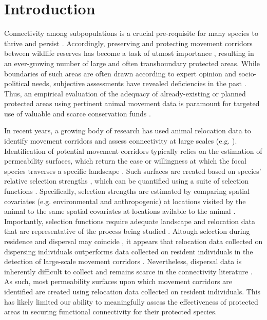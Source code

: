 \documentclass[abstract=on,10pt,a4paper,bibliography=totocnumbered]{article}
\begin{document}
\newpage


\linenumbers

\section{Introduction}
Connectivity among subpopulations is a crucial pre-requisite for many species to
thrive and persist \citep{Fahrig.2003}. Accordingly, preserving and protecting
movement corridors between wildlife reserves has become a task of utmost
importance \citep{Doerr.2011, Rudnick.2012}, resulting in an ever-growing number
of large and often transboundary protected areas. While boundaries of such areas
are often drawn according to expert opinion and socio-political needs,
subjective assessments have revealed deficiencies in the past
\citep{Clevenger.2002, Pullinger.2010}. Thus, an empirical evaluation of the
adequacy of already-existing or planned protected areas using pertinent animal
movement data is paramount for targeted use of valuable and scarce conservation
funds \citep{Pullinger.2010}.

In recent years, a growing body of research has used animal relocation data to
identify movement corridors and assess connectivity at large scales (e.g.
\citealp{Chetkiewicz.2006, Squires.2013, Elliot.2014}). Identification of
potential movement corridors typically relies on the estimation of permeability
surfaces, which return the ease or willingness at which the focal species
traverses a specific landscape \citep{Sawyer.2011}. Such surfaces are created
based on species' relative selection strengths \citep{Avgar.2017}, which can be
quantified using a suite of selection functions \citep{Zeller.2012}.
Specifically, selection strengths are estimated by comparing spatial covariates
(e.g. environmental and anthropogenic) at locations visited by the animal to the
same spatial covariates at locations avilable to the animal \citep{Zeller.2012}.
Importantly, selection functions require adequate landscape and relocation data
that are representative of the process being studied \citep{Diniz.2020}. Altough
selection during residence and dispersal may coincide \citep{Fattebert.2015}, it
appears that relocation data collected on dispersing individuals outperforms
data collected on resident individuals in the detection of large-scale movement
corridors \citep{Elliot.2014, Abrahms.2017, Diniz.2020}. Nevertheless, dispersal
data is inherently difficult to collect and remains scarce in the connectivity
literature \citep{Vasudev.2015}. As such, most permeability surfaces upon which
movement corridors are identified are created using relocation data collected on
resident individuals. This has likely limited our ability to meaningfully assess
the effectiveness of protected areas in securing functional connectivity for
their protected species.
\end{document}
